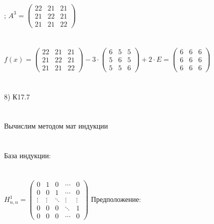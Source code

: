 \documentclass[12pt, a4paper]{article}
\begin{document}
	  ; 
	  \begin{math}
	  	A^3 = 
	  	\left(
	  	\begin{array}{rrr}
	  		22  & 21 & 21\\
	  		21 & 22 & 21\\
	  		21 & 21 & 22
	  	\end{array}
	  	\right )
	  \end{math}
	  \\\\\\
	  $f(x) = 
	  \left(
	  \begin{array}{rrr}
	  	22  & 21 & 21\\
	  	21 & 22 & 21\\
	  	21 & 21 & 22
	  \end{array}
	  \right )
	  - 3 \cdot
	  \left(
	  \begin{array}{rrr}
	  	6  & 5 & 5\\
	  	5 & 6 & 5\\
	  	5 & 5 & 6
	  \end{array}
	  \right )
	  + 2\cdot E = 
	  \left (
	  \begin{array}{rrr}
	  	6  & 6 & 6\\
	  	6 & 6 & 6\\
	  	6 & 6 & 6
	  \end{array}
	  \right )
	  $
	  \\\\\\
	  8) К17.7
	  \\\\\\
	  Вычислим методом мат индукции
	  \\\\\\
	  База индукции: 
	  \\\\\\ 
	  \begin{math}
	  	H  ^ 1 _ {n,n} = 
	  	\left(
	  	\begin{array}{ccccc}
	  		0 & 1 & 0 & \cdots &0 \\
	  		0& 0 & 1 & \cdots & 0 \\
	  		\vdots& \vdots & \ddots & \vdots & \vdots \\
	  		0 & 0 & 0 & \ddots & 1\\
	  		0 & 0& 0& \cdots & 0
	  	\end{array} 
	  	\right )
	  \end{math}
	  \newpage
	  Предположение:
\end{document}
